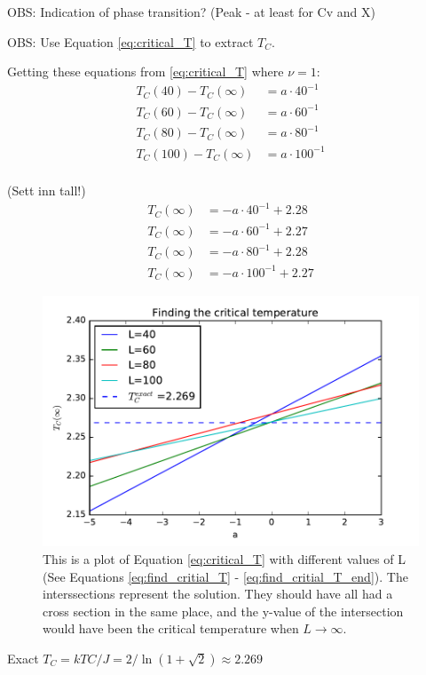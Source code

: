 OBS: Indication of phase transition? (Peak - at least for Cv and X)

OBS: Use Equation \ref{eq:critical_T} to extract $T_C$.

Getting these equations from \ref{eq:critical_T} where $\nu = 1$:
\begin{align*}
T_C(40) - T_C(\infty) &= a \cdot 40^{-1}\\
T_C(60) - T_C(\infty) &= a \cdot 60^{-1}\\
T_C(80) - T_C(\infty) &= a \cdot 80^{-1}\\
T_C(100) - T_C(\infty) &= a \cdot 100^{-1}\\
\end{align*}

(Sett inn tall!)
\begin{align}\label{eq:find_critial_T}
T_C(\infty) &= - a \cdot 40^{-1} + 2.28\\
T_C(\infty) &= - a \cdot 60^{-1} + 2.27\\
T_C(\infty) &= - a \cdot 80^{-1} + 2.28\\
T_C(\infty) &= - a \cdot 100^{-1} + 2.27\label{eq:find_critial_T_end}
\end{align}

\begin{figure}[H]
\includegraphics[width=\linewidth]{../results/4f/critical_t}\caption{This is a plot of Equation \ref{eq:critical_T} with different values of L (See Equations \ref{eq:find_critial_T} - \ref{eq:find_critial_T_end}). The interssections represent the solution. They should have all had a cross section in the same place, and the y-value of the intersection would have been the critical temperature when $L \rightarrow \infty$.}\label{fig:critical_T}
\end{figure}

Exact $T_C =  kTC/J = 2/ \ln(1+\sqrt{
2}) \approx 2.269$ \cite{Onsager}